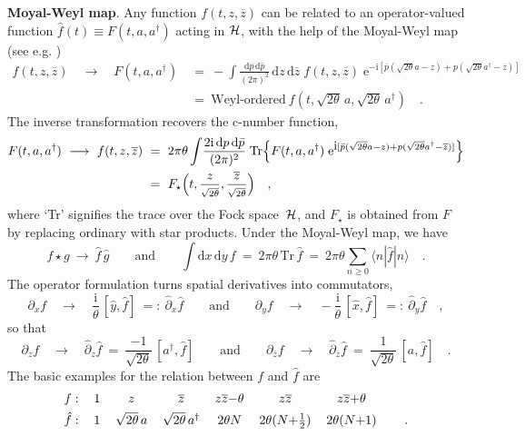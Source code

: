 \documentclass[a4paper,11pt]{article}
\numberwithin{equation}{section}
\def\th{\theta}
\newcommand{\Hcal}{{\cal H}}
\def\e{\mbox{e}}
\def\i{\mbox{i}}
\def\pa{\mbox{$\partial$}}
\def\diff{\mbox{d}}
\def\sfrac#1#2{{\textstyle\frac{#1}{#2}}}
\newcommand{\adag}{a^{\dagger}}
\newcommand{\fh}{\hat{f}}
\newcommand{\gh}{\hat{g}}
\newcommand{\zb}{\overline{z}}
\begin{document}
\noindent
{\bf Moyal-Weyl map}.
Any function $f(t,z,\zb)$ can be related to an operator-valued
function $\fh(t)\equiv F(t,a,\adag)$ acting in $\Hcal$,
with the help of the Moyal-Weyl map (see e.g. \cite{alv,gross3})
\begin{align}
f(t,z,\zb)\quad \longrightarrow \quad F(t,a,\adag)\ &=\ -\int\!
\frac{\diff{p}\,\diff{\bar{p}}}{(2\pi)^2}\,\diff{z}\,\diff{\zb}\;
f(t,z,\zb)\;\e^{-\i[\bar{p}(\sqrt{2\theta}a-z)+p(\sqrt{2\theta}\adag-\zb)]}
\nonumber \\
&=\ \textrm{Weyl-ordered} \  f(t,\sqrt{2\th}\,a,\sqrt{2\th}\,\adag) \quad.
\end{align}
The inverse transformation recovers the c-number function,
\begin{align}
F(t,a,\adag)\ \longrightarrow\ f(t,z,\zb)\ &=\ 2\pi\theta \int\!
\frac{2\i\,\diff{p}\,\diff{\bar{p}}}{(2\pi)^2}\;\mbox{Tr}\Bigl\{F(t,a,\adag)\;
\e^{\i[\bar{p}(\sqrt{2\theta}a-z)+p(\sqrt{2\theta}\adag-\zb)]} \Bigr\}
\nonumber \\
&=\ F_\star \Bigl(
t,\frac{z}{\scriptstyle\sqrt{2\th}},\frac{\zb}{\scriptstyle\sqrt{2\th}}
\Bigr) \quad, \label{inverseMoyal}
\end{align}
where `Tr' signifies the trace over the Fock space~$\Hcal$,
and $F_\star$ is obtained from $F$ by replacing ordinary with star products.
Under the Moyal-Weyl map, we have
\begin{equation} \label{trace}
f\star g\ \longrightarrow\ \fh\,\gh \qquad\textrm{and}\qquad
\int\! \diff{x}\,\diff{y}\,f\ =\
2\pi \theta \,\mbox{Tr}\, \fh\ =\
2\pi \theta \sum_{n \geq 0} \langle n|\fh |n \rangle \quad.
\end{equation}
The operator formulation turns spatial derivatives into commutators,
\begin{equation}
\pa_x f \quad \longrightarrow \quad \frac{\i}{\theta}\, [\hat{y},\fh]
\ =:\ \hat{\pa}_x \fh
\qquad\textrm{and}\qquad
\pa_y f \quad \longrightarrow \quad -\frac{\i}{\theta}\, [\hat{x},\fh]
\ =:\ \hat{\pa}_y \fh \quad,
\end{equation}
so that
\begin{equation}
\pa_z f \quad \longrightarrow \quad \hat{\pa}_z \fh
\ =\ \frac{-1}{\sqrt{2\th}}\,[\adag,\fh]
\qquad\textrm{and}\qquad
\pa_{\zb} f \quad \longrightarrow \quad \hat{\pa}_{\zb} \fh
\ =\ \frac{1}{\sqrt{2\th}}\,[a,\fh] \quad.
\end{equation}
The basic examples for the relation between $f$ and $\hat{f}$ are
\begin{equation}
\begin{tabular}{cccccccc}
$f:$	   & $1$ & $z$ 	            & $\zb$	           & $z\zb{-}\th$ &
$z\zb$               & $z\zb{+}\th$  &  \\[4pt]
$\hat{f}:$ & $1$ & $\sqrt{2\th}\,a$ & $\sqrt{2\th}\,\adag$ & $2\th N$     &
$2\th(N{+}\sfrac12)$ & $2\th(N{+}1)$ & \quad. \\
\end{tabular}
\end{equation}
\end{document}
